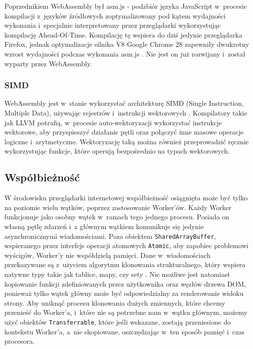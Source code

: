 Poprzednikiem WebAssembly był asm.js - podzbiór języka JavaScript w~procesie kompilacji z~języków źródłowych zoptymalizowany pod kątem wydajności wykonania i~specjalnie interpretowany przez przeglądarki wykorzystując kompilację Ahead-Of-Time. Kompilację tę wspiera do dziś jedynie przeglądarka Firefox, jednak optymalizacje silnika V8 Google Chrome 28 zapewniły dwukrotny wzrost wydajności podczas wykonania asm.js \cite{asm.js-chrome}. Nie jest on już rozwijany i~został wyparty przez WebAssembly.

\subsubsection{SIMD}

WebAssembly jest w~stanie wykorzystać architekturę SIMD (Single Instruction, Multiple Data), używając rejestrów i~instrukcji wektorowych \cite{wasm-simd}. Kompilatory takie jak LLVM potrafią, w~procesie auto-wektoryzacji wykorzystać instrukcje wektorowe, aby przyspieszyć działanie pętli oraz połączyć inne masowe operacje logiczne i~arytmetyczne. Wektoryzację taką można również przeprowadzić ręcznie wykorzystując funkcje, które operują bezpośrednio na typach wektorowych.

\subsection{Współbieżność}

W środowisku przeglądarki internetowej współbieżność osiągnięta może być tylko na poziomie wielu wątków, poprzez zastosowanie Worker'ów. Każdy Worker funkcjonuje jako osobny wątek w~ramach tego jednego procesu. Posiada on własną pętlę zdarzeń i~z głównym wątkiem komunikuje się jedynie asynchronicznymi wiadomościami. Poza obiektem \lstinline{SharedArrayBuffer}, wspieranego przez interfejs operacji atomowych \lstinline{Atomic}, aby zapobiec problemowi wyścigów, Worker'y nie współdzielą pamięci. Dane w~wiadomościach przekazywane są z~użyciem algorytmu klonowania strukturalnego, który wspiera natywne typy takie jak tablice, mapy, czy sety \cite{structured-clone}. Nie możliwe jest natomiast kopiowanie funkcji zdefiniowanych przez użytkownika oraz węzłów drzewa DOM, ponieważ tylko wątek główny może być odpowiedzialny za renderowanie widoku strony. Aby uniknąć procesu klonowania dużych zmiennych, które chcemy przenieść do Worker'a, i~które nie są potrzebne nam w~wątku głównym, możemy użyć obiektów \lstinline{Transferrable}, które jeśli wskazane, zostają przeniesione do kontekstu Worker'a, a~nie skopiowane, oszczędzając w~ten sposób pamięć i~czas procesora.

